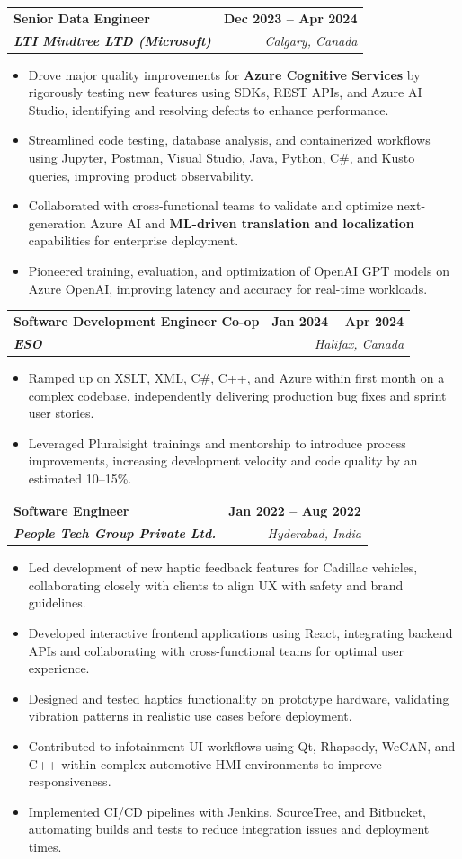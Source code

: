 \documentclass[letterpaper,11pt]{article}
\makeatletter
\newcommand{\resumeItem}[1]{
  \item\small{
    {#1 \vspace{-2pt}}
  }
}
\newcommand{\resumeSubheading}[4]{
  \vspace{-2pt}\item
    \begin{tabular*}{1.0\textwidth}[t]{l@{\extracolsep{\fill}}r}
      \textbf{#1} & \textbf{\small #2} \\
      \textit{\small#3} & \textit{\small #4} \\
    \end{tabular*}\vspace{-7pt}
}
\newcommand{\resumeItemListStart}{\begin{itemize}}
\newcommand{\resumeItemListEnd}{\end{itemize}\vspace{-5pt}}
\makeatother
\begin{document}
    \resumeSubheading
      {\textbf{Senior Data Engineer}}{\textbf{Dec 2023 -- Apr 2024}}
      {\textbf{LTI Mindtree LTD (Microsoft)}}{Calgary, Canada}
      \resumeItemListStart
        \resumeItem{Drove major quality improvements for \textbf{Azure Cognitive Services} by rigorously testing new features using SDKs, REST APIs, and Azure AI Studio, identifying and resolving defects to enhance performance.}
        \resumeItem{Streamlined code testing, database analysis, and containerized workflows using Jupyter, Postman, Visual Studio, Java, Python, C\#, and Kusto queries, improving product observability.}
        \resumeItem{Collaborated with cross-functional teams to validate and optimize next-generation Azure AI and \textbf{ML-driven translation and localization} capabilities for enterprise deployment.}
        \resumeItem{Pioneered training, evaluation, and optimization of OpenAI GPT models on Azure OpenAI, improving latency and accuracy for real-time workloads.}
      \resumeItemListEnd
    
    \resumeSubheading
      {\textbf{Software Development Engineer Co-op}}{\textbf{Jan 2024 -- Apr 2024}}
      {\textbf{ESO}}{Halifax, Canada}
      \resumeItemListStart
        \resumeItem{Ramped up on XSLT, XML, C\#, C++, and Azure within first month on a complex codebase, independently delivering production bug fixes and sprint user stories.}
        \resumeItem{Leveraged Pluralsight trainings and mentorship to introduce process improvements, increasing development velocity and code quality by an estimated 10--15\%.}
      \resumeItemListEnd

    \resumeSubheading
      {\textbf{Software Engineer}}{\textbf{Jan 2022 -- Aug 2022}}
      {\textbf{People Tech Group Private Ltd.}}{Hyderabad, India}
      \resumeItemListStart
        \resumeItem{Led development of new haptic feedback features for Cadillac vehicles, collaborating closely with clients to align UX with safety and brand guidelines.}
        \resumeItem{Developed interactive frontend applications using React, integrating backend APIs and collaborating with cross-functional teams for optimal user experience.}
        \resumeItem{Designed and tested haptics functionality on prototype hardware, validating vibration patterns in realistic use cases before deployment.}
        \resumeItem{Contributed to infotainment UI workflows using Qt, Rhapsody, WeCAN, and C++ within complex automotive HMI environments to improve responsiveness.}
        \resumeItem{Implemented CI/CD pipelines with Jenkins, SourceTree, and Bitbucket, automating builds and tests to reduce integration issues and deployment times.}
      \resumeItemListEnd
\end{document}
